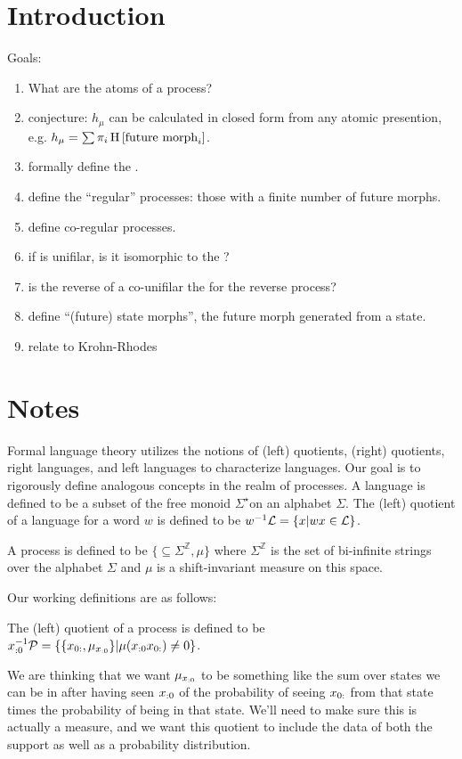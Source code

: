 \documentclass[prl,twocolumn,showpacs,superscriptaddress,preprintnumbers,floatfix]{revtex4-1}
\theoremstyle{plain}    \newtheorem{Lem}{Lemma}
\theoremstyle{plain}    \newtheorem*{ProLem}{Proof}
\theoremstyle{plain}    \newtheorem{Cor}{Corollary}
\theoremstyle{plain}    \newtheorem*{ProCor}{Proof}
\theoremstyle{plain}    \newtheorem{The}{Theorem}
\theoremstyle{plain}    \newtheorem*{ProThe}{Proof}
\theoremstyle{plain}    \newtheorem{Prop}{Proposition}
\theoremstyle{plain}    \newtheorem*{ProProp}{Proof}
\theoremstyle{plain}    \newtheorem*{Conj}{Conjecture}
\theoremstyle{plain}    \newtheorem*{Rem}{Remark}
\theoremstyle{plain}    \newtheorem{Def}{Definition}
\theoremstyle{plain}    \newtheorem*{Not}{Notation}
\begin{document}
\section{Introduction}
\label{sec:introduction}
Goals:
\begin{enumerate}
  \item What are the atoms of a process?
  \item conjecture: $h_\mu$ can be calculated in closed form from any atomic
    presention, e.g. $h_\mu = \sum \pi_i \operatorname{H}\left[\textrm{future morph}_i\right]$.
  \item formally define the \eT.
  \item define the ``regular'' processes: those with a finite number of future
    morphs.
  \item define co-regular processes.
  \item if \eT is unifilar, is it isomorphic to the \eM?
  \item is the reverse of a co-unifilar \eM the \eM for the reverse
    process?
  \item define ``(future) state morphs'', the future morph generated from a
    state.
  \item relate to Krohn-Rhodes
\end{enumerate}

\section{Notes} Formal language theory utilizes the notions of (left) quotients,
(right) quotients, right languages, and left languages to characterize
languages.  Our goal is to rigorously define analogous concepts in the realm of
processes.  A language \Language is defined to be a subset of the free monoid
$\Sigma^{\star}$on an alphabet $\Sigma$. The (left) quotient of a language
\Language for a word $w$ is defined to be $w^{-1}\mathcal{L} = \{ x | wx \in
\mathcal{L} \}$.

A process \Process is defined to be $\{\subseteq \Sigma^{\mathbb{Z}}, \mu\}$
where $\Sigma^{\mathbb{Z}}$ is the set of bi-infinite strings over the alphabet
$\Sigma$ and $\mu$ is a shift-invariant measure on this space.

Our working definitions are as follows:

The (left) quotient of a process \Process is defined to be ${x}_{:0}^{-1} \mathcal{P} =
\{ \{ {x}_{0:}, \mu_{{x}_{:0}} \} | \mu({x}_{:0} {x}_{0:}) \neq 0 \}$.

We are thinking that we want $\mu_{{x}_{:0}}$ to be something like the sum over
states we can be in after having seen ${x}_{:0}$ of the probability of seeing
${x}_{0:}$ from that state times the probability of being in that state.
We'll need to make sure this is actually a measure, and we want this quotient to
include the data of both the support as well as a probability distribution.
\end{document}
